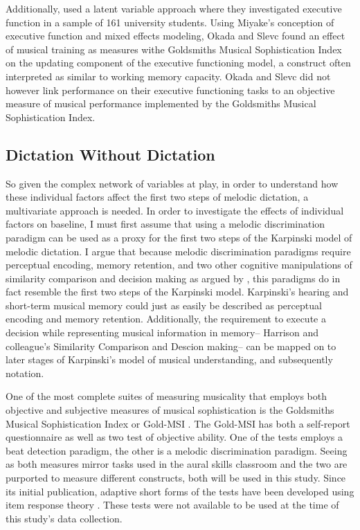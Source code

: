 \documentclass[]{book}
\begin{document}
Additionally, \citet{okadaIndividualDifferencesMusical2018} used a latent variable approach where they investigated executive function in a sample of 161 university students.
Using Miyake's conception of executive function \citep{miyakeNatureOrganizationIndividual2012, miyakeUnityDiversityExecutive2000} and mixed effects modeling, Okada and Slevc found an effect of musical training as measures withe Goldsmiths Musical Sophistication Index on the updating component of the executive functioning model, a construct often interpreted as similar to working memory capacity.
Okada and Slevc did not however link performance on their executive functioning tasks to an objective measure of musical performance implemented by the Goldsmiths Musical Sophistication Index.

\hypertarget{dictation-without-dictation}{%
\subsection{Dictation Without Dictation}\label{dictation-without-dictation}}

So given the complex network of variables at play, in order to understand how these individual factors affect the first two steps of melodic dictation, a multivariate approach is needed.
In order to investigate the effects of individual factors on baseline, I must first assume that using a melodic discrimination paradigm can be used as a proxy for the first two steps of the Karpinski model of melodic dictation.
I argue that because melodic discrimination paradigms require perceptual encoding, memory retention, and two other cognitive manipulations of similarity comparison and decision making as argued by \citet{harrisonModellingMelodicDiscrimination2016}, this paradigms do in fact resemble the first two steps of the Karpinski model.
Karpinski's hearing and short-term musical memory could just as easily be described as perceptual encoding and memory retention.
Additionally, the requirement to execute a decision while representing musical information in memory-- Harrison and colleague's Similarity Comparison and Descion making-- can be mapped on to later stages of Karpinski's model of musical understanding, and subsequently notation.

One of the most complete suites of measuring musicality that employs both objective and subjective measures of musical sophistication is the Goldsmiths Musical Sophistication Index or Gold-MSI \citep{mullensiefenMusicalityNonMusiciansIndex2014}.
The Gold-MSI has both a self-report questionnaire as well as two test of objective ability.
One of the tests employs a beat detection paradigm, the other is a melodic discrimination paradigm.
Seeing as both measures mirror tasks used in the aural skills classroom and the two are purported to measure different constructs, both will be used in this study.
Since its initial publication, adaptive short forms of the tests have been developed using item response theory \citep{harrisonApplyingModernPsychometric2017a}.
These tests were not available to be used at the time of this study's data collection.
\end{document}
